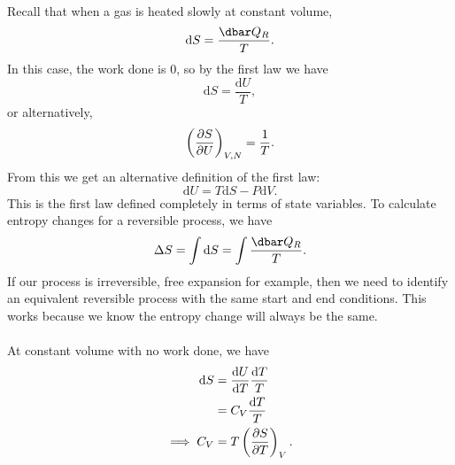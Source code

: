 \documentclass[../thermodynamics.tex]{subfiles}
\begin{document}
        \paragraph{}
        Recall that when a gas is heated slowly at constant volume,
        \begin{equation}
            \mathrm{d}S=\frac{\dbar Q_R}{T}.
        \end{equation}
        In this case, the work done is 0, so by the first law we have
        \begin{equation}
            \mathrm{d}S=\frac{\mathrm{d}U}{T},
        \end{equation}
        or alternatively,
        \begin{equation}
            \left(\frac{\partial S}{\partial U}\right)_{V,N}=\frac{1}{T}.
        \end{equation}
        From this we get an alternative definition of the first law:
        \begin{equation}
            \mathrm{d}{U}=T\mathrm{d}S-P\mathrm{d}V.
        \end{equation}
        This is the first law defined completely in terms of state variables.
        To calculate entropy changes for a reversible process, we have
        \begin{equation}
            \Delta S=\int\mathrm{d}S=\int\frac{\dbar Q_R}{T}.
        \end{equation}
        If our process is irreversible, free expansion for example, then we need to identify an equivalent reversible process with the same start and end conditions.
        This works because we know the entropy change will always be the same.

        \paragraph{}
        At constant volume with no work done, we have
        \begin{align}
            \mathrm{d}S&=\frac{\mathrm{d}U}{\mathrm{d}T}\frac{\mathrm{d}T}{T}\\
            &=C_V\frac{\mathrm{d}T}{T}\\
            \implies C_V&=T\left(\frac{\partial S}{\partial T}\right)_V.
        \end{align}
\end{document}
